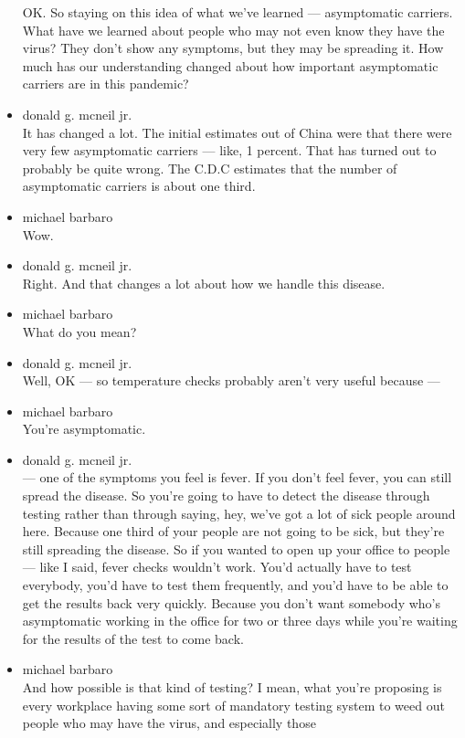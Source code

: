\begin{itemize}
  OK. So staying on this idea of what we've learned --- asymptomatic
  carriers. What have we learned about people who may not even know they
  have the virus? They don't show any symptoms, but they may be
  spreading it. How much has our understanding changed about how
  important asymptomatic carriers are in this pandemic?
\item
  donald g. mcneil jr.\\
  It has changed a lot. The initial estimates out of China were that
  there were very few asymptomatic carriers --- like, 1 percent. That
  has turned out to probably be quite wrong. The C.D.C estimates that
  the number of asymptomatic carriers is about one third.
\item
  michael barbaro\\
  Wow.
\item
  donald g. mcneil jr.\\
  Right. And that changes a lot about how we handle this disease.
\item
  michael barbaro\\
  What do you mean?
\item
  donald g. mcneil jr.\\
  Well, OK --- so temperature checks probably aren't very useful because
  ---
\item
  michael barbaro\\
  You're asymptomatic.
\item
  donald g. mcneil jr.\\
  --- one of the symptoms you feel is fever. If you don't feel fever,
  you can still spread the disease. So you're going to have to detect
  the disease through testing rather than through saying, hey, we've got
  a lot of sick people around here. Because one third of your people are
  not going to be sick, but they're still spreading the disease. So if
  you wanted to open up your office to people --- like I said, fever
  checks wouldn't work. You'd actually have to test everybody, you'd
  have to test them frequently, and you'd have to be able to get the
  results back very quickly. Because you don't want somebody who's
  asymptomatic working in the office for two or three days while you're
  waiting for the results of the test to come back.
\item
  michael barbaro\\
  And how possible is that kind of testing? I mean, what you're
  proposing is every workplace having some sort of mandatory testing
  system to weed out people who may have the virus, and especially those

\end{itemize}
